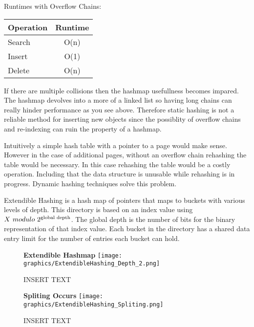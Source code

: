 \documentclass[letterpaper, 12pt]{article}
\begin{document}
Runtimes with Overflow Chains:
\par\vspace{\baselineskip}
\begin{center}
\begin{tabular}{l | c}
  \hline
  Operation & Runtime \\ \hline \hline
  Search & O(n) \\ \hline
  Insert & O(1) \\ \hline
  Delete & O(n) \\ \hline
\end{tabular}
\end{center}

If there are multiple collisions then the hashmap usefullness becomes impared. The hashmap devolves into a more
of a linked list so having long chains can really hinder performance as you see above. Therefore static hashing
is not a reliable method for inserting new objects since the possiblity of overflow chains and re-indexing can
ruin the property of a hashmap.
\par\vspace{\baselineskip}

Intuitively a simple hash table with a pointer to a page would make sense. However in the case of
additional pages, without an overflow chain rehashing the table would be necessary. In this
case rehashing the table would be a costly operation. Including that the data structure is unusable
while rehashing is in progress. Dynamic hashing techniques solve this problem.
\par\vspace{\baselineskip}

Extendible Hashing is a hash map of pointers that maps to buckets with various levels of depth. This directory
is based on an index value using $ X\ modulo\ 2\textsuperscript{global depth} $. The global depth is the number of bits for the binary
representation of that index value. Each bucket in the directory has a shared data entry limit for the number of
entries each bucket can hold.

\begin{figure}
  \centering
  \textbf{Extendible Hashmap}
  \texttt{[image: graphics/ExtendibleHashing\_Depth\_2.png]}
  \caption{INSERT TEXT}
\end{figure}

\begin{figure}
  \centering
  \textbf{Spliting Occurs}
  \texttt{[image: graphics/ExtendibleHashing\_Spliting.png]}
  \caption{INSERT TEXT}
\end{figure}
\end{document}
